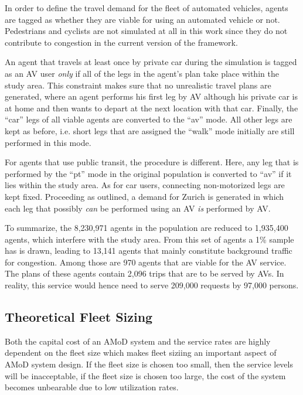In order to define the travel demand for the fleet of automated vehicles, agents
are tagged as whether they are viable for using an automated vehicle or not. Pedestrians and cyclists are not simulated at all in this work since they do not contribute to congestion in the current version of the framework. 

An agent that travels at least once by private car during the simulation is tagged
as an AV user \textit{only} if all of the legs in the agent's plan take place
within the study area. This constraint makes sure that no unrealistic travel
plans are generated, where an agent performs his first leg by AV although his
private car is at home and then wants to depart at the next location with that
car. Finally, the ``car'' legs of all viable agents are converted to the ``av'' mode.
All other legs are kept as before, i.e. short legs that are assigned the ``walk''
mode initially are still performed in this mode.

For agents that use public transit, the procedure is different. Here, any leg
that is performed by the ``pt'' mode in the original population is converted to ``av''
if it lies within the study area. As for car users, connecting non-motorized
legs are kept fixed. Proceeding as outlined, a demand for Zurich is generated in which each leg that possibly
\textit{can} be performed using an AV \textit{is} performed by AV.

To summarize, the 8,230,971 agents in the population are reduced to
1,935,400 agents, which interfere with the study area. From this set of agents
a 1\% sample has is drawn, leading to 13,141 agents that mainly constitute
background traffic for congestion. Among those are 970 agents that are viable for the AV
service. The plans of these agents contain 2,096 trips that are to be served by
AVs. In reality, this service would hence need to serve 209,000 requests by
97,000 persons.

\subsection{Theoretical Fleet Sizing}

Both the capital cost of an AMoD system and the service rates are highly dependent
on the fleet size which makes fleet siziing an important aspect of AMoD system design.
If the fleet size is chosen too small, then the service levels will be inacceptable, if the fleet size is chosen too large, the cost of the system becomes unbearable due to low utilization rates.

